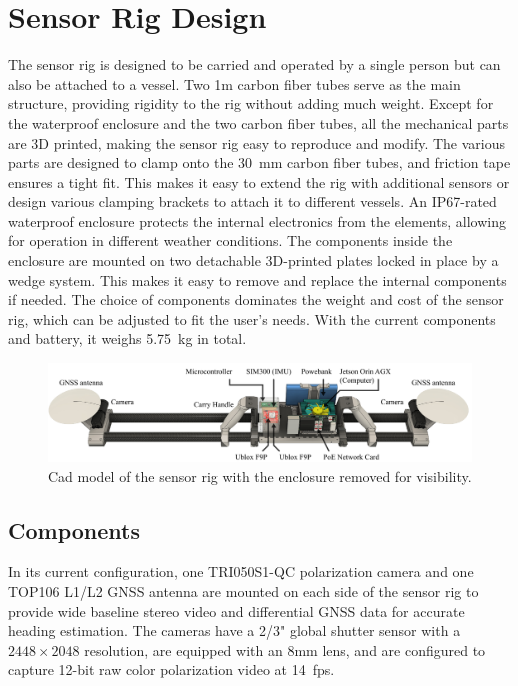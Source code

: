 \section{Sensor Rig Design}
The sensor rig is designed to be carried and operated by a single person but can also be attached to a vessel.
Two 1m carbon fiber tubes serve as the main structure, providing rigidity to the rig without adding much weight.
Except for the waterproof enclosure and the two carbon fiber tubes, all the mechanical parts are 3D printed, making the sensor rig easy to reproduce and modify.
The various parts are designed to clamp onto the \SI{30}{mm} carbon fiber tubes, and friction tape ensures a tight fit.
This makes it easy to extend the rig with additional sensors or design various clamping brackets to attach it to different vessels.
An IP67-rated waterproof enclosure protects the internal electronics from the elements, allowing for operation in different weather conditions.
The components inside the enclosure are mounted on two detachable 3D-printed plates locked in place by a wedge system. This makes it easy to remove and replace the internal components if needed.
The choice of components dominates the weight and cost of the sensor rig, which can be adjusted to fit the user's needs.
With the current components and battery, it weighs \SI{5.75}{kg} in total.

\begin{figure}[H]
    \centering
    \includegraphics[width=\textwidth]{figures/rig_components.pdf}
    \caption{Cad model of the sensor rig with the enclosure removed for visibility.}
\end{figure}

\subsection{Components}
In its current configuration, one TRI050S1-QC polarization camera and one TOP106 L1/L2 GNSS antenna are mounted on each side of the sensor rig to provide wide baseline stereo video and differential GNSS data for accurate heading estimation.
The cameras have a 2/3" global shutter sensor with a $2448\times2048$ resolution, are equipped with an 8mm lens, and are configured to capture 12-bit raw color polarization video at \SI{14}{fps}.

